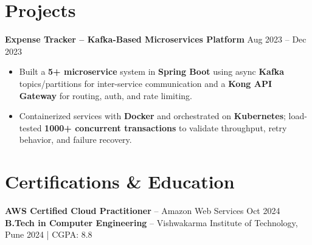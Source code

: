\documentclass[a4paper,10pt]{article}
\begin{document}
\section*{Projects}

\textbf{Expense Tracker -- Kafka-Based Microservices Platform} \hfill Aug 2023 -- Dec 2023
\begin{itemize}[leftmargin=*]
    \item Built a \textbf{5+ microservice} system in \textbf{Spring Boot} using async \textbf{Kafka} topics/partitions for inter-service communication and a \textbf{Kong API Gateway} for routing, auth, and rate limiting.
    \item Containerized services with \textbf{Docker} and orchestrated on \textbf{Kubernetes}; load-tested \textbf{1000+ concurrent transactions} to validate throughput, retry behavior, and failure recovery.
\end{itemize}

\section*{Certifications \& Education}
\textbf{AWS Certified Cloud Practitioner} -- Amazon Web Services \hfill Oct 2024 \\
\textbf{B.Tech in Computer Engineering} -- Vishwakarma Institute of Technology, Pune \hfill 2024 \;|\; CGPA: 8.8
\end{document}
